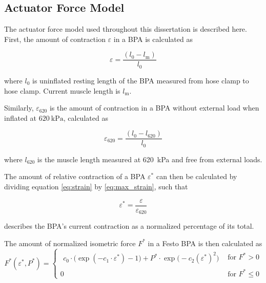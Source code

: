 \subsection{Actuator Force Model}\label{sec:force_model}


The actuator force model used throughout this dissertation is described here. First, the amount of contraction ${\varepsilon}$ in a BPA is calculated as

\begin{equation}
    {\varepsilon} = \frac{(l_{0}-l_\text{m})}{l_{0}} \label{eq:strain}
\end{equation}

where $l_{0}$ is uninflated resting length of the BPA measured from hose clamp to hose clamp. Current muscle length is $l_\text{m}$.

Similarly, ${\varepsilon_{620}}$ is the amount of contraction in a BPA without external load when inflated at $\qty{620}{\kPa}$, calculated as 

\begin{equation}
    \varepsilon_{620} = \frac{(l_{0}-l_{620})}{l_{0}} \label{eq:max_strain}
\end{equation}

where $l_{620}$ is the muscle length measured at \qty{620}{\kPa} and free from external loads. 

The amount of relative contraction of a BPA $\varepsilon^*$ can then be calculated by dividing equation \eqref{eq:strain} by \eqref{eq:max_strain}, such that

\begin{equation}
    \varepsilon^* = \frac{\varepsilon}{\varepsilon_{620}} \label{eq:rel_strain}
\end{equation}

describes the BPA's current contraction as a normalized percentage of its total.

The amount of normalized isometric force $F^*$ in a Festo BPA is then calculated as
\begin{equation}
F^*(\varepsilon^*,P^*)=
\begin{cases}
\begin{aligned}
c_0\cdot\bigl(\exp(-c_1 \cdot \varepsilon^*)-1\bigr)
+ P^*\cdot\exp\!\bigl(-c_2(\varepsilon^*)^{2}\bigr)
\end{aligned}
& \text{for } F^*>0\\[10pt]
0
& \text{for } F^*\le 0
\end{cases}\label{eq:Fstar}
\end{equation}

